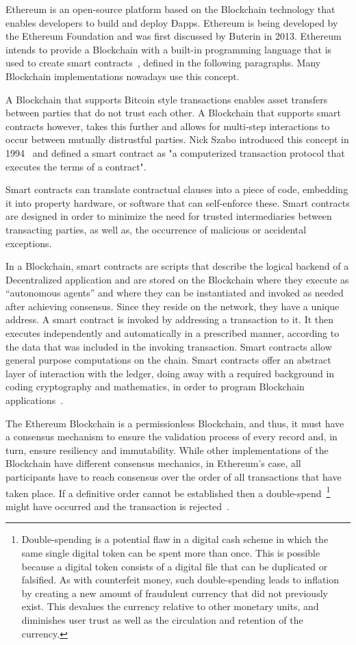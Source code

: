 Ethereum is an open-source platform based on the Blockchain technology that
enables developers to build and deploy Ðapps. Ethereum is being developed by
the Ethereum Foundation and was first discussed by Buterin in 2013. Ethereum
intends to provide a Blockchain with a built-in programming language that is
used to create smart contracts~\cite{Wood2017}, defined in the following
paragraphs.  Many Blockchain implementations nowadays use this concept.

A Blockchain that supports Bitcoin style transactions enables asset transfers
between parties that do not trust each other. A Blockchain that supports smart
contracts however, takes this further and allows for multi-step interactions to
occur between mutually distrustful parties. Nick Szabo introduced this concept
in 1994~\cite{Christidis2016} and defined a smart contract as "a computerized
transaction protocol that executes the terms of a contract". 

Smart contracts can translate contractual clauses into a piece of code,
embedding it into property hardware, or software that can self-enforce these.
Smart contracts are designed in order to minimize the need for trusted
intermediaries between transacting parties, as well as, the occurrence of
malicious or accidental exceptions.

In a Blockchain, smart contracts are scripts that describe the logical backend
of a Decentralized application and are stored on the Blockchain where they
execute as “autonomous agents” and where they can be instantiated and invoked
as needed after achieving consensus.  Since they reside on the network, they
have a unique address. A smart contract is invoked by addressing a transaction
to it.  It then executes independently and automatically in a prescribed
manner, according to the data that was included in the invoking transaction.
Smart contracts allow general purpose computations on the chain.  Smart
contracts offer an abstract layer of interaction with the ledger, doing away
with a required background in coding cryptography and mathematics, in order to
program Blockchain applications~\cite{Wood2017,BlockGeeks2017}.

The Ethereum Blockchain is a permissionless Blockchain, and thus, it must have
a consensus mechanism to ensure the validation process of every record and, in
turn, ensure resiliency and immutability. While other implementations of the
Blockchain have different consensus mechanics, in Ethereum’s case, all
participants have to reach consensus over the order of all transactions that
have taken place. If a definitive order cannot be established then a
double-spend~\footnote{Double-spending is a potential flaw in a digital cash
scheme in which the same single digital token can be spent more than once.
This is possible because a digital token consists of a digital file that can be
duplicated or falsified. As with counterfeit money, such double-spending leads
to inflation by creating a new amount of fraudulent currency that did not
previously exist. This devalues the currency relative to other monetary units,
and diminishes user trust as well as the circulation and retention of the
currency.} might have occurred and the transaction is rejected~\cite{Wood2017}.

